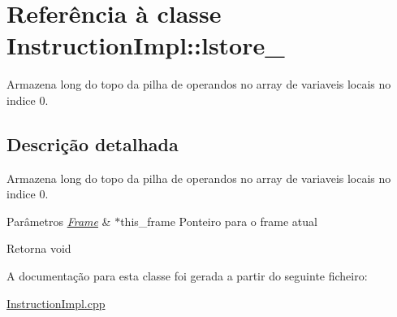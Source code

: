 \hypertarget{class_instruction_impl_1_1lstore__0}{}\section{Referência à classe Instruction\+Impl\+:\+:lstore\+\_}
\label{class_instruction_impl_1_1lstore__0}


Armazena long do topo da pilha de operandos no array de variaveis locais no indice 0.  




\subsection{Descrição detalhada}
Armazena long do topo da pilha de operandos no array de variaveis locais no indice 0. 


\begin{DoxyParams}{Parâmetros}
{\em \hyperlink{struct_frame}{Frame}} & $\ast$this\+\_\+frame Ponteiro para o frame atual \\
\hline
\end{DoxyParams}
\begin{DoxyReturn}{Retorna}
void 
\end{DoxyReturn}


A documentação para esta classe foi gerada a partir do seguinte ficheiro\+:\begin{DoxyCompactItemize}
\item 
\hyperlink{_instruction_impl_8cpp}{Instruction\+Impl.\+cpp}\end{DoxyCompactItemize}
